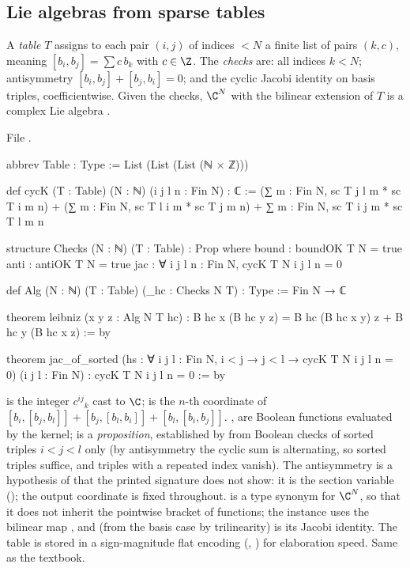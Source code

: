 \subsection{Lie algebras from sparse tables}

\begin{definition}\label{l23:def:scalg}
A \emph{table} $T$ assigns to each pair $(i,j)$ of indices $<N$ a finite list of pairs $(k,c)$, meaning $[b_i,b_j]=\sum c\,b_k$ with
$c\in\Z$. The \emph{checks} are: all indices $k<N$; antisymmetry $[b_i,b_j]+[b_j,b_i]=0$; and the cyclic Jacobi identity on basis triples,
coefficientwise. Given the checks, $\C^N$ with the bilinear extension of $T$ is a complex Lie algebra .
\end{definition}
\noindent File .
\begin{leancode}
abbrev Table : Type := List (List (List (ℕ × ℤ)))

def cycK (T : Table) (N : ℕ) (i j l n : Fin N) : ℂ :=
  (∑ m : Fin N, sc T j l m * sc T i m n) + (∑ m : Fin N, sc T l i m * sc T j m n) +
    ∑ m : Fin N, sc T i j m * sc T l m n

structure Checks (N : ℕ) (T : Table) : Prop where
  bound : boundOK T N = true
  anti : antiOK T N = true
  jac : ∀ i j l n : Fin N, cycK T N i j l n = 0

def Alg (N : ℕ) (T : Table) (_hc : Checks N T) : Type := Fin N → ℂ

theorem leibniz (x y z : Alg N T hc) :
    B hc x (B hc y z) = B hc (B hc x y) z + B hc y (B hc x z) := by

theorem jac_of_sorted (hs : ∀ i j l : Fin N, i < j → j < l → cycK T N i j l n = 0) (i j l : Fin N) :
    cycK T N i j l n = 0 := by
\end{leancode}

\begin{dictionary}
 is the integer $c^{ij}{}_k$ cast to $\C$;  is the $n$-th coordinate of
$[b_i,[b_j,b_l]]+[b_j,[b_l,b_i]]+[b_l,[b_i,b_j]]$. ,  are Boolean functions evaluated by the kernel;
 is a \emph{proposition}, established by  from Boolean checks of sorted triples $i<j<l$ only (by
antisymmetry the cyclic sum is alternating, so sorted triples suffice, and triples with a repeated index vanish). The antisymmetry is
a hypothesis of  that the printed signature does not show: it is the section variable
 (); the output coordinate  is fixed throughout.  is a type
synonym for $\C^N$, so that it does not inherit the pointwise bracket of functions; the instance  uses the
bilinear map , and  (from the basis case by trilinearity) is its Jacobi identity. The table is stored in a
sign-magnitude flat encoding (, ) for elaboration speed. Same as the textbook.
\end{dictionary}

